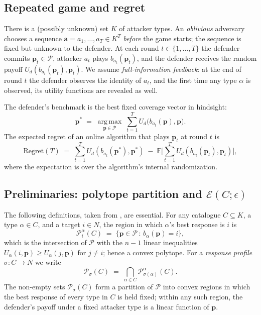 \documentclass[letterpaper,9pt,twocolumn]{extarticle}
\newcommand{\pvec}{\mathbf{p}}
\newcommand{\avec}{\mathbf{a}}
\newcommand{\cP}{\mathcal{P}}
\newcommand{\cE}{\mathcal{E}}
\newcommand{\EE}{\mathbb{E}}
\newcommand{\argmax}{\operatorname*{arg\,max}}
\newcommand{\Regret}{\mathrm{Regret}}
\theoremstyle{plain}
\theoremstyle{definition}
\theoremstyle{remark}
\begin{document}
\subsection{Repeated game and regret}

There is a (possibly unknown) set $K$ of attacker types. An
\emph{oblivious} adversary chooses a sequence
$\avec=a_1,\dots,a_T\in K^T$ \emph{before} the game starts; the sequence
is fixed but unknown to the defender. At each round
$t\in\{1,\dots,T\}$ the defender commits $\pvec_t\in\cP$, attacker
$a_t$ plays $b_{a_t}(\pvec_t)$, and the defender receives the random
payoff $U_d(b_{a_t}(\pvec_t),\pvec_t)$. We assume \emph{full-information
feedback}: at the end of round $t$ the defender observes the identity of
$a_t$, and the first time any type $\alpha$ is observed, its utility
functions are revealed as well.

The defender's benchmark is the best fixed coverage vector in hindsight:
\begin{equation}
\pvec^{*}\;=\;\argmax_{\pvec\in\cP}\;\sum_{t=1}^T U_d\bigl(b_{a_t}(\pvec),\pvec\bigr).
\label{eq:pstar}
\end{equation}
The expected regret of an online algorithm that plays $\pvec_t$ at round
$t$ is
\begin{equation}
\Regret(T)\;=\;\sum_{t=1}^T\!U_d(b_{a_t}(\pvec^{*}),\pvec^{*})\;-\;\EE\!\bigg[\sum_{t=1}^T\!U_d(b_{a_t}(\pvec_t),\pvec_t)\bigg],
\label{eq:regret}
\end{equation}
where the expectation is over the algorithm's internal randomization.

\subsection{Preliminaries: polytope partition and $\cE(C;\epsilon)$}
\label{sec:polytopes}

The following definitions, taken from \citet[Sec.~4]{balcan2015}, are
essential. For any catalogue $C\subseteq K$, a type $\alpha\in C$, and a
target $i\in N$, the region in which $\alpha$'s best response is $i$ is
\begin{equation}
\cP^\alpha_i(C)\;=\;\{\pvec\in\cP\,:\,b_\alpha(\pvec)=i\},
\label{eq:Pia}
\end{equation}
which is the intersection of $\cP$ with the $n-1$ linear inequalities
$U_\alpha(i,\pvec)\ge U_\alpha(j,\pvec)$ for $j\ne i$; hence a convex
polytope. For a \emph{response profile}
$\sigma:C\to N$ we write
\begin{equation}
\cP_\sigma(C)\;=\;\bigcap_{\alpha\in C}\cP^\alpha_{\sigma(\alpha)}(C).
\label{eq:Psigma}
\end{equation}
The non-empty sets $\cP_\sigma(C)$ form a partition of $\cP$ into convex
regions in which the best response of every type in $C$ is held fixed;
within any such region, the defender's payoff under a fixed attacker type
is a linear function of $\pvec$.
\end{document}
